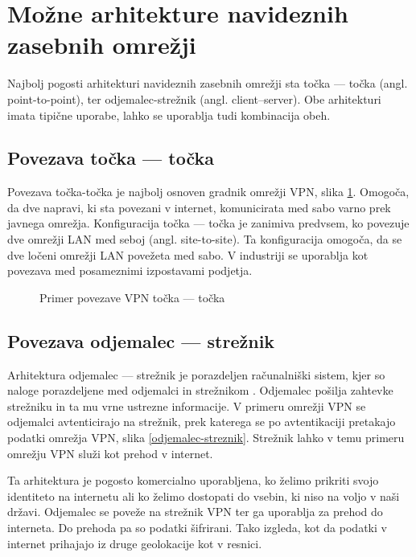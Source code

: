 \documentclass[a4paper, 12pt]{book}
\begin{document}
\section{Možne arhitekture navideznih zasebnih omrežji}
Najbolj pogosti arhitekturi navideznih zasebnih omrežji sta točka --- točka (angl. point-to-point), ter odjemalec-strežnik (angl. client–server). Obe arhitekturi imata tipične uporabe, lahko se uporablja tudi kombinacija obeh.

\subsection{Povezava točka --- točka}
Povezava točka-točka je najbolj osnoven gradnik omrežji VPN, slika \ref{tocka-tocka}. Omogoča, da dve napravi, ki sta povezani v internet, komunicirata med sabo varno prek javnega omrežja. Konfiguracija točka --- točka je zanimiva predvsem, ko povezuje dve omrežji LAN med seboj (angl. site-to-site). Ta konfiguracija omogoča, da se dve ločeni omrežji LAN povežeta med sabo. V industriji se uporablja kot povezava med posameznimi izpostavami podjetja.

\begin{figure}[h]
\begin{center}
\end{center}
\caption{Primer povezave VPN točka --- točka \cite{rvidmar}}
\label{tocka-tocka}
\end{figure}


\subsection{Povezava odjemalec --- strežnik}
Arhitektura odjemalec --- strežnik je porazdeljen računalniški sistem, kjer so naloge porazdeljene med odjemalci in strežnikom \cite{bidgoli_encyclopedia_2003}. Odjemalec pošilja zahtevke strežniku in ta mu vrne ustrezne informacije. V primeru omrežji VPN se odjemalci avtenticirajo na strežnik, prek katerega se po avtentikaciji pretakajo podatki omrežja VPN, slika \ref{odjemalec-streznik}. Strežnik lahko v temu primeru omrežju VPN služi kot prehod v internet. 


Ta arhitektura je pogosto komercialno uporabljena, ko želimo prikriti svojo identiteto na internetu ali ko želimo dostopati do vsebin, ki niso na voljo v naši državi. Odjemalec se poveže na strežnik VPN ter ga uporablja za prehod do interneta. Do prehoda pa so podatki šifrirani. Tako izgleda, kot da podatki v internet prihajajo iz druge geolokacije kot v resnici.
\end{document}
